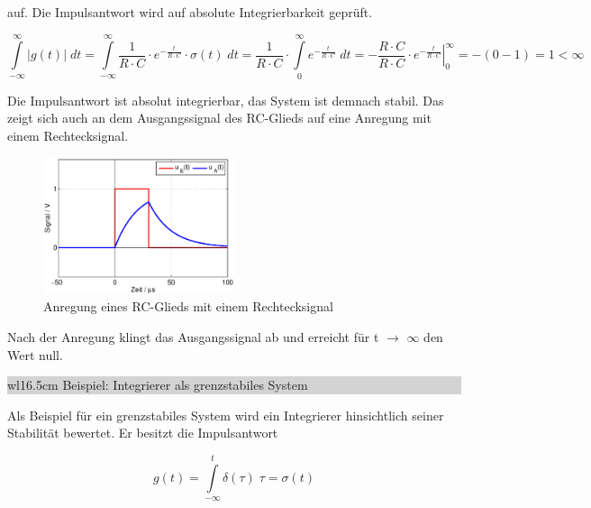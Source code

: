 \noindent auf. Die Impulsantwort wird auf absolute Integrierbarkeit gepr\"{u}ft.

\begin{equation}\label{eq:threehundredeightyeight}
\int\limits _{-\infty }^{\infty }\left|g\left(t\right)\right|\;dt =\int\limits _{-\infty }^{\infty }\frac{1}{R\cdot C} \cdot e^{-\frac{t}{R\cdot C} } \cdot \sigma \left(t\right)\;dt =\frac{1}{R\cdot C} \cdot \int\limits _{0}^{\infty }e^{-\frac{t}{R\cdot C} } \;dt =-\frac{R\cdot C}{R\cdot C} \cdot \left. e^{-\frac{t}{R\cdot C} } \right|_{0}^{\infty } =-\left(0-1\right)=1<\infty
\end{equation}

\noindent Die Impulsantwort ist absolut integrierbar, das System ist demnach stabil. Das zeigt sich auch an dem Ausgangssignal des RC-Glieds auf eine Anregung mit einem Rechtecksignal.

\begin{figure}[H]
  \centerline{\includegraphics[width=0.5\textwidth]{Kapitel2/Bilder/image24.eps}}
  \caption{Anregung eines RC-Glieds mit einem Rechtecksignal}
  \label{fig:inconnue}
\end{figure}

\noindent Nach der Anregung klingt das Ausgangssignal ab und erreicht f\"{u}r t $\rightarrow$ $\mathrm{\infty}$ den Wert null.\bigskip

\noindent
\colorbox{lightgray}{%
%
\renewcommand\arraystretch{0.6}%
\begin{tabular}{ wl{16.5cm} }
{\selectfont
\noindent
Beispiel: Integrierer als grenzstabiles System}
\end{tabular}%
}\bigskip

\noindent Als Beispiel für ein grenzstabiles System wird ein Integrierer hinsichtlich seiner Stabilität bewertet. Er besitzt die Impulsantwort

\begin{equation}\label{eq:threehundredeightynine}
g\left(t\right)=\int\limits _{-\infty }^{t}\delta \left(\tau \right) \;\tau =\sigma \left(t\right)
\end{equation}

